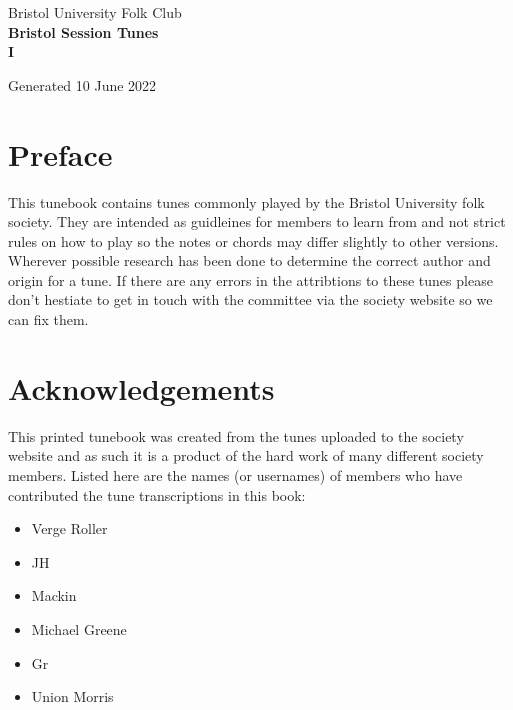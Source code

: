 \documentclass[12pt,a4paper,twoside]{article}
\makeatletter
\newcommand{\thetitle}{Bristol Session Tunes \\ \vspace{0.65cm} I}
\newcommand{\thedate}{10 June 2022}
\renewcommand\tableofcontents{%
    \begin{multicols}{2}[
      \centering
      \section*{\large\contentsname
        \@mkboth{%
           \MakeUppercase\contentsname}{\MakeUppercase\contentsname}}]
    \@starttoc{toc}%
    \end{multicols}
}
\makeatother
\begin{document}
\begin{titlepage}
   \begin{center}
       \large Bristol University Folk Club \\

       \vspace{4cm}
       \textbf{\Huge \thetitle}

       \vspace{0.5cm}
       Generated \thedate

       \vspace{1.5cm}

       \vfill

   \end{center}
\end{titlepage}

\tableofcontents

\section{Preface}

This tunebook contains tunes commonly played by the Bristol University folk society. They are intended as guidleines for members to learn from and not strict rules on how to play so the notes or chords may differ slightly to other versions.
Wherever possible research has been done to determine the correct author and origin for a tune. If there are any errors in the attribtions to these tunes please don't hestiate to get in touch with the committee via the society website so we can fix them.

\section{Acknowledgements}

This printed tunebook was created from the tunes uploaded to the society website and as such it is a product of the hard work of many different society members. Listed here are the names (or usernames) of members who have contributed the tune transcriptions in this book:

\begin{multicols}{2}
\begin{itemize}\item Verge Roller
\item JH
\item Mackin
\item Michael Greene
\item Gr
\item Union Morris
\end{itemize}

\end{multicols}
\end{document}
